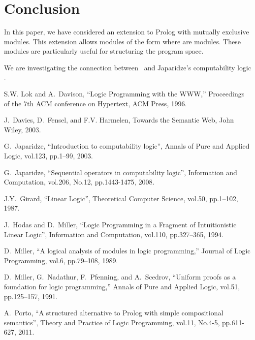 \documentclass[12pt]{article}
\begin{document}
\section{Conclusion}\label{sec:conc}

In this paper, we have considered an extension to Prolog with  
mutually exclusive  modules. This extension allows modules of 
the form    where  are modules.
These modules are 
 particularly useful for structuring the program space.


  We are investigating the connection between \hweb\ and Japaridze's
computability logic \cite{Jap03,Jap08}.





\begin{thebibliography}{1}

S.W. Lok and A.~Davison, ``Logic {P}rogramming with the {WWW},'' Proceedings of
  the 7th ACM conference on Hypertext, ACM Press, 1996.

J.~Davies, D.~Fensel, and F.V. Harmelen, Towards the Semantic Web, John Wiley,
  2003.


G.~Japaridze, ``Introduction to computability logic'', Annals  of Pure and
 Applied  Logic, vol.123, pp.1--99, 2003.

G.~Japaridze,   ``Sequential operators in computability logic'',
 Information and Computation, vol.206, No.12, pp.1443-1475, 2008.  



J.Y.~Girard, ``Linear Logic'', Theoretical Computer Science, vol.50, pp.1--102, 
1987.

J.~Hodas and D.~Miller, ``Logic Programming in a Fragment of Intuitionistic Linear Logic'', Information and Computation, vol.110, pp.327--365, 1994.



D.~Miller, ``A logical analysis of modules in logic programming,'' Journal of
  Logic Programming, vol.6, pp.79--108, 1989.

D.~Miller, G.~Nadathur, F.~Pfenning, and A.~Scedrov, ``Uniform proofs as a
  foundation for logic programming,'' Annals of Pure and Applied Logic, vol.51,
  pp.125--157, 1991.


A.~Porto,   ``A structured alternative to Prolog with simple compositional
               semantics'',
 Theory and Practice of Logic Programming, vol.11, No.4-5, pp.611-627, 2011.  


\end{thebibliography}
\end{document}
